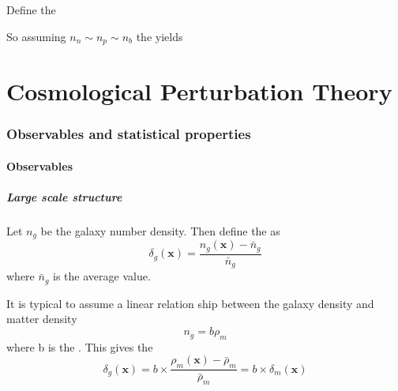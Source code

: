 \documentclass{article}
\begin{document}
\begin{definition}
Define the  
\end{definition}

So assuming $n_n\sim n_p\sim n_b$ the  yields



\part{Cosmological Perturbation Theory}
\section{Observables and statistical properties}
\subsection{Observables}
\subsubsection*{Large scale structure}
\begin{definition}
Let $n_g$ be the galaxy number density. Then define the  as 
\[
\delta_g(\bm{x}) = \frac{n_g(\bm{x})-\bar{n}_g}{\bar{n}_g}
\]
where $\bar{n}_g$ is the average value. 
\end{definition}

It is typical to assume a linear relation ship between the galaxy density and matter density 
\[
n_g = b \rho_m
\]
where b is the . This gives the 
\[
\delta_g(\bm{x}) = b \times \frac{\rho_m(\bm{x})-\bar{\rho}_m}{\bar{\rho}_m} = b \times \delta_m(\bm{x})
\]
\end{document}
